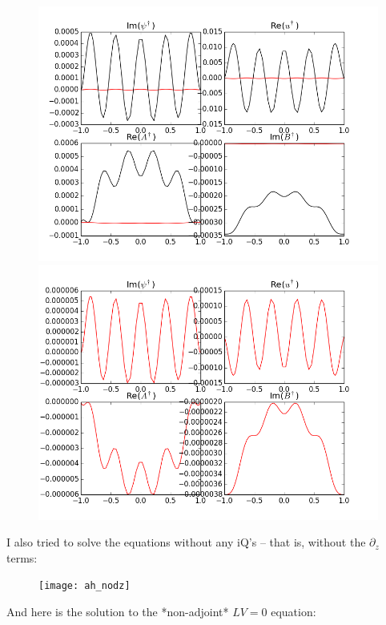 \documentclass[letterpaper,12pt]{article}
\begin{document}
\begin{figure}[h!]
\centering
\includegraphics[scale=0.5]{ah_allpos}
\includegraphics[scale=0.5]{ah_allpos_redonly}
\end{figure}

\pagebreak
I also tried to solve the equations without any iQ's -- that is, without the $\partial_z$ terms: \\

\begin{figure}[h!]
\centering
\texttt{[image: ah\_nodz]}
\end{figure}

And here is the solution to the *non-adjoint* $LV = 0$ equation:
\end{document}
